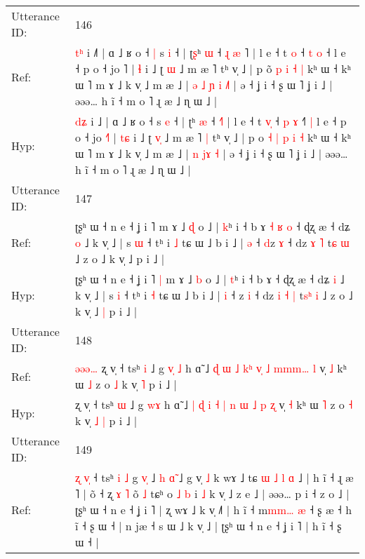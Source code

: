 \documentclass[10pt]{article}
\DeclareRobustCommand{\hl}[1]{{\textcolor{red}{#1}}}
\begin{document}
\begin{longtable}{ll}
Utterance ID: & 146 \\
Ref: & \hl{t}\hl{ʰ} i ˩\hl{˥} | ɑ ˩ ʁ o ˧\hl{ }\hl{|} s \hl{i} ˧ | ʈ\hl{ʂ}ʰ \hl{ɯ} ˧\hl{ }\hl{ɻ} \hl{æ}\hl{ }˥ | l e ˧ t \hl{}\hl{o} ˧ \hl{t} \hl{o} ˧\hl{}\hl{}\hl{} l e ˧ p o ˧ jo \hl{}˥ | \hl{}\hl{ɬ} i ˩ ʈ \hl{}\hl{ɯ} ˩ m æ ˥\hl{}\hl{} tʰ v̩ ˩ | p o\hl{}\hl{̃} \hl{p} \hl{i} \hl{˧} \hl{|} kʰ ɯ ˧ kʰ ɯ ˥ m ɤ ˩ k v̩ ˩ m æ ˩ |\hl{ }\hl{ə} \hl{˩} \hl{ɲ}\hl{ }\hl{i} \hl{˩}\hl{˥} | ə ˧ ʝ i ˧ ʂ ɯ ˥ ʝ i ˩ | əəə… h ĩ ˧ m o ˥ ɻ æ ˩ ɳ ɯ ˩ |
 \\
Hyp: & \hl{d}\hl{ʑ} i ˩\hl{} | ɑ ˩ ʁ o ˧\hl{}\hl{} s \hl{e} ˧ | ʈ\hl{}ʰ \hl{æ} ˧\hl{}\hl{} \hl{}\hl{˧}˥ | l e ˧ t \hl{v}\hl{̩} ˧ \hl{p} \hl{ɤ} ˧\hl{˥}\hl{ }\hl{|} l e ˧ p o ˧ jo \hl{˧}˥ | \hl{t}\hl{ɕ} i ˩ ʈ \hl{v}\hl{̩} ˩ m æ ˥\hl{ }\hl{|} tʰ v̩ ˩ | p o\hl{ }\hl{˧} \hl{|} \hl{p} \hl{i} \hl{˧} kʰ ɯ ˧ kʰ ɯ ˥ m ɤ ˩ k v̩ ˩ m æ ˩ |\hl{}\hl{} \hl{n} \hl{}\hl{j}\hl{ɤ} \hl{}\hl{˧} | ə ˧ ʝ i ˧ ʂ ɯ ˥ ʝ i ˩ | əəə… h ĩ ˧ m o ˥ ɻ æ ˩ ɳ ɯ ˩ |
 \\
\midrule
Utterance ID: & 147 \\
Ref: & ʈʂʰ ɯ ˧ n e ˧ ʝ i ˥\hl{}\hl{} m ɤ ˩ \hl{ɖ} o ˩ | \hl{k}ʰ i ˧ b ɤ\hl{ }\hl{˧}\hl{ }\hl{ʁ}\hl{ }\hl{o} ˧ ɖʐ æ ˧ dʑ \hl{o} ˩ k v̩ ˩ | s \hl{ɯ} ˧ tʰ i \hl{˩} tɕ ɯ ˩ b i ˩ | \hl{ə} ˧ \hl{d}z \hl{ɤ} ˧ dz\hl{}\hl{} \hl{ɤ} \hl{˥} t\hl{}\hl{ɕ} \hl{ɯ} ˩ z o ˩ k v̩ ˩\hl{}\hl{} p i ˩ |
 \\
Hyp: & ʈʂʰ ɯ ˧ n e ˧ ʝ i ˥\hl{ }\hl{|} m ɤ ˩ \hl{b} o ˩ | \hl{t}ʰ i ˧ b ɤ\hl{}\hl{}\hl{}\hl{}\hl{}\hl{} ˧ ɖʐ æ ˧ dʑ \hl{i} ˩ k v̩ ˩ | s \hl{i} ˧ tʰ i \hl{˧} tɕ ɯ ˩ b i ˩ | \hl{i} ˧ \hl{}z \hl{i} ˧ dz\hl{ }\hl{i} \hl{˧} \hl{|} t\hl{s}\hl{ʰ} \hl{i} ˩ z o ˩ k v̩ ˩\hl{ }\hl{|} p i ˩ |
 \\
\midrule
Utterance ID: & 148 \\
Ref: & \hl{ə}\hl{ə}\hl{ə}\hl{…}\hl{ }ʐ v̩ ˧ tsʰ \hl{i} ˩ g \hl{v}\hl{̩}\hl{ }\hl{˩} h ɑ̃ ˩ \hl{ɖ} \hl{ɯ} \hl{˩} \hl{k}\hl{ʰ} \hl{v}\hl{̩} \hl{˩} \hl{}\hl{m}\hl{m}\hl{m}\hl{…} \hl{l} v̩ \hl{˩} kʰ ɯ \hl{˩} z o \hl{˩} k v̩\hl{}\hl{} \hl{˥} p i ˩ |
 \\
Hyp: & \hl{}\hl{}\hl{}\hl{}\hl{}ʐ v̩ ˧ tsʰ \hl{ɯ} ˩ g \hl{}\hl{}\hl{w}\hl{ɤ} h ɑ̃ ˩ \hl{|} \hl{ɖ} \hl{i} \hl{}\hl{˧} \hl{}\hl{|} \hl{n} \hl{ɯ}\hl{ }\hl{˩}\hl{ }\hl{p} \hl{ʐ} v̩ \hl{˧} kʰ ɯ \hl{˥} z o \hl{˧} k v̩\hl{ }\hl{˩} \hl{|} p i ˩ |
 \\
\midrule
Utterance ID: & 149 \\
Ref: & \hl{ʐ}\hl{ }\hl{v}\hl{̩} ˧ tsʰ \hl{i} \hl{˩} g \hl{v}\hl{̩} ˩\hl{ }\hl{h} \hl{ɑ}\hl{̃} ˩ g v̩ \hl{˩} k wɤ ˩ tɕ\hl{ }\hl{ɯ}\hl{ }\hl{˩}\hl{ }\hl{l} \hl{ɑ} ˩ | h ĩ ˧ ɻ æ ˥ | õ ˧ ʐ \hl{}\hl{ɤ} \hl{˥} õ\hl{}\hl{} \hl{˩} tɕʰ o\hl{}\hl{} \hl{˩} \hl{b} i \hl{˩} k v̩ ˩ z e ˩ | əəə… p i ˧ z o ˩ | ʈʂʰ ɯ ˧ n e ˧ ʝ i ˥ | ʐ wɤ ˩ k v̩ ˩˥ | h ĩ ˧ m\hl{}\hl{}\hl{}\hl{m}\hl{m}\hl{…} \hl{æ} ˧ ʂ æ ˧\hl{}\hl{} h ĩ ˧ ʂ ɯ ˧ | n jæ ˧ s ɯ ˩ k v̩ ˩ | ʈʂʰ ɯ ˧ n e ˧ ʝ\hl{}\hl{}\hl{}\hl{} i ˥ | h ĩ ˧ ʂ ɯ ˧ |

\end{longtable}
\end{document}
